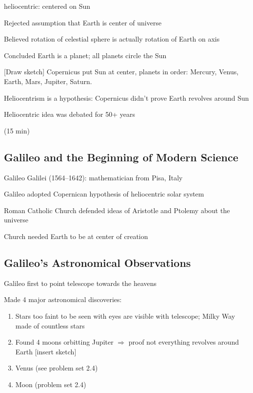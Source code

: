 \documentclass{article}
\begin{document}
\gls{heliocentric}: centered on Sun

Rejected assumption that Earth is center of universe

Believed rotation of celestial sphere is actually rotation of Earth on axis


Concluded Earth is a planet; all planets circle the Sun

[Draw sketch] Copernicus put Sun at center, planets in order: Mercury, Venus, Earth, Mars, Jupiter, Saturn.

Heliocentrism is a hypothesis: Copernicus didn't prove Earth revolves around Sun

Heliocentric idea was debated for 50+ years

{\color{lightgray} \footnotesize (15 min)}
\vspace{-1ex}

\hgraydashline

\subsection*{Galileo and the Beginning of Modern Science}

Galileo Galilei (1564–1642): mathematician from Pisa, Italy

Galileo adopted Copernican hypothesis of  heliocentric solar system

Roman Catholic Church defended ideas of Aristotle and Ptolemy about the universe

Church needed Earth to be at center of creation

\subsection*{Galileo's Astronomical Observations}

Galileo first to point telescope towards the heavens

Made 4 major astronomical discoveries:
\vspace{-1em}

\begin{enumerate}
\setlength\itemsep{0.1ex}
    \item Stars too faint to be seen with eyes are visible with telescope; Milky Way made of countless stars
    \item Found 4 moons orbitting Jupiter $\Rightarrow$ proof not everything revolves around Earth [insert sketch]
    \item Venus (see problem set 2.4)
    \item Moon (problem set 2.4)

\end{enumerate}
\end{document}
